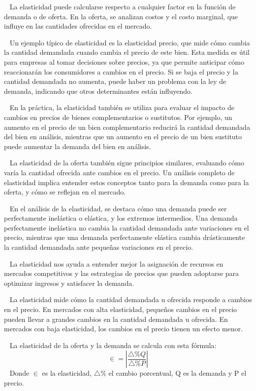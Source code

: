 \documentclass[
  letterpaper,
  DIV=11,
  numbers=noendperiod]{scrreport}
\begin{document}
~ La elasticidad puede calcularse respecto a cualquier factor en la
función de demanda o de oferta. En la oferta, se analizan costos y el
costo marginal, que influye en las cantidades ofrecidas en el mercado.

~ Un ejemplo típico de elasticidad es la elasticidad precio, que mide
cómo cambia la cantidad demandada cuando cambia el precio de este bien.
Esta medida es útil para empresas al tomar decisiones sobre precios, ya
que permite anticipar cómo reaccionarán los consumidores a cambios en el
precio. Si se baja el precio y la cantidad demandada no aumenta, puede
haber un problema con la ley de demanda, indicando que otros
determinantes están influyendo.

~ En la práctica, la elasticidad también se utiliza para evaluar el
impacto de cambios en precios de bienes complementarios o sustitutos.
Por ejemplo, un aumento en el precio de un bien complementario reducirá
la cantidad demandada del bien en análisis, mientras que un aumento en
el precio de un bien sustituto puede aumentar la demanda del bien en
análisis.

~ La elasticidad de la oferta también sigue principios similares,
evaluando cómo varía la cantidad ofrecida ante cambios en el precio. Un
análisis completo de elasticidad implica entender estos conceptos tanto
para la demanda como para la oferta, y cómo se reflejan en el mercado.

~ En el análisis de la elasticidad, se destaca cómo una demanda puede
ser perfectamente inelástica o elástica, y los extremos intermedios. Una
demanda perfectamente inelástica no cambia la cantidad demandada ante
variaciones en el precio, mientras que una demanda perfectamente
elástica cambia drásticamente la cantidad demandada ante pequeñas
variaciones en el precio.

~ La elasticidad nos ayuda a entender mejor la asignación de recursos en
mercados competitivos y las estrategias de precios que pueden adoptarse
para optimizar ingresos y satisfacer la demanda.

~ La elasticidad mide cómo la cantidad demandada u ofrecida responde a
cambios en el precio. En mercados con alta elasticidad, pequeños cambios
en el precio pueden llevar a grandes cambios en la cantidad demandada u
ofrecida. En mercados con baja elasticidad, los cambios en el precio
tienen un efecto menor.

~ La elasticidad de la oferta y la demanda se calcula con esta fórmula:
\[
\in =\left|\frac{\triangle\%Q}{\triangle\%P} \right|
\] ~ Donde \(\in\) es la elasticidad, \(\triangle\%\) el cambio
porcentual, Q es la demanda y P el precio.
\end{document}
